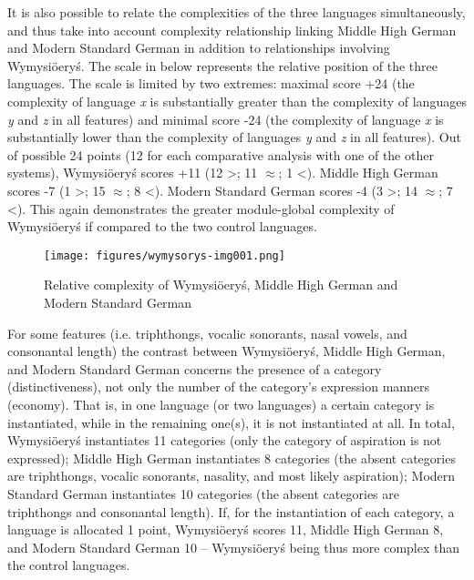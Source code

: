 \documentclass[output=paper]{langscibook}
\begin{document}
It is also possible to relate the complexities of the three languages simultaneously, and thus take into account complexity relationship linking Middle High German and Modern Standard German in addition to relationships involving Wymysiöeryś. The scale in  below represents the relative position of the three languages. The scale is limited by two extremes: maximal score +24 (the complexity of language \textit{x} is substantially greater than the complexity of languages \textit{y} and \textit{z} in all features) and minimal score -24 (the complexity of language \textit{x} is substantially lower than the complexity of languages \textit{y} and \textit{z} in all features). Out of possible 24 points (12 for each comparative analysis with one of the other systems), Wymysiöeryś scores +11 (12 >; 11 ${\approx}$; 1 <). Middle High German scores -7 (1 >; 15 ${\approx}$; 8 <). Modern Standard German scores -4 (3 >; 14 ${\approx}$; 7 <). This again demonstrates the greater module-global complexity of Wymysiöeryś if compared to the two control languages.

\begin{figure}
\caption{Relative complexity of Wymysiöeryś, Middle High German and Modern Standard German}
\texttt{[image: figures/wymysorys-img001.png]}
\label{fig:Wymysiöeryś:1}
\end{figure}


For some features (i.e. triphthongs, vocalic sonorants, nasal vowels, and consonantal length) the contrast between Wymysiöeryś, Middle High German, and Modern Standard German concerns the presence of a category (distinctiveness), not only the number of the category’s expression manners (economy). That is, in one language (or two languages) a certain category is instantiated, while in the remaining one(s), it is not instantiated at all. In total, Wymysiöeryś instantiates 11 categories (only the category of aspiration is not expressed); Middle High German instantiates 8 categories (the absent categories are triphthongs, vocalic sonorants, nasality, and most likely aspiration); Modern Standard German instantiates 10 categories (the absent categories are triphthongs and consonantal length). If, for the instantiation of each category, a language is allocated 1 point, Wymysiöeryś scores 11, Middle High German 8, and Modern Standard German 10 – Wymysiöeryś being thus more complex than the control languages. 
\end{document}
